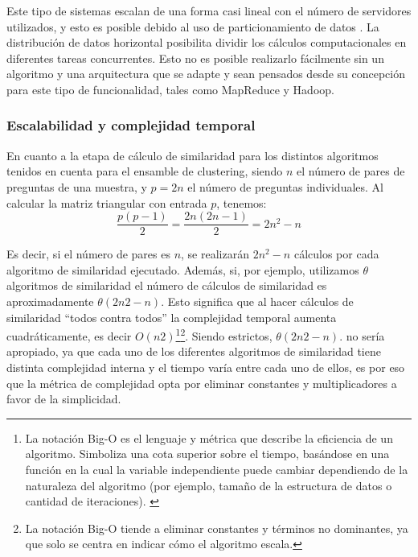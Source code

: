 \bigskip Este tipo de sistemas escalan de una forma casi lineal con el número de servidores utilizados, y esto es posible debido al uso de particionamiento de datos \citep{pokorny2013nosql}. La distribución de datos horizontal posibilita dividir los cálculos computacionales en diferentes tareas concurrentes. Esto no es posible realizarlo fácilmente sin un algoritmo y una arquitectura que se adapte y sean pensados desde su concepción para este tipo de funcionalidad, tales como MapReduce y Hadoop.

\subsubsection{Escalabilidad y complejidad temporal}
En cuanto a la etapa de cálculo de similaridad para los distintos algoritmos tenidos en cuenta para el ensamble de clustering, siendo \(n\) el número de pares de preguntas de una muestra, y \(p = 2n\) el número de preguntas individuales. Al calcular la matriz triangular con entrada \(p\), tenemos:
\[\frac{p(p-1)}{2} = \frac{2n(2n-1)}{2} = 2n^2-n\]

Es decir, si el número de pares es \(n\), se realizarán \(2n^2-n\) cálculos por cada algoritmo de similaridad ejecutado. Además, si, por ejemplo, utilizamos \(\theta\) algoritmos de similaridad el número de cálculos de similaridad es aproximadamente \(\theta(2n2-n)\). Esto significa que al hacer cálculos de similaridad “todos contra todos” la complejidad temporal aumenta cuadráticamente, es decir \(O(n2)\)\footnote{La notación Big-O es el lenguaje y métrica que describe la eficiencia de un algoritmo. Simboliza una cota superior sobre el tiempo, basándose en una función en la cual la variable independiente puede cambiar dependiendo de la naturaleza del algoritmo (por ejemplo, tamaño de la estructura de datos o cantidad de iteraciones). \citep{cormen2009introduction}}\footnote{La notación Big-O tiende a eliminar constantes y términos no dominantes, ya que solo se centra en indicar cómo el algoritmo escala. }. Siendo estrictos, \(\theta(2n2-n)\). no sería apropiado, ya que cada uno de los diferentes algoritmos de similaridad tiene distinta complejidad interna y el tiempo varía entre cada uno de ellos, es por eso que la métrica de complejidad opta por eliminar constantes y multiplicadores a favor de la simplicidad.

